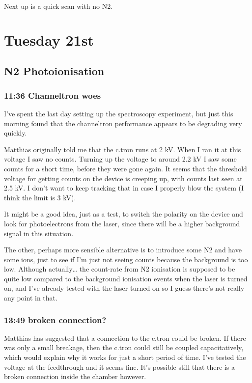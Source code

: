 \documentclass[11pt]{article}
\begin{document}
Next up is a quick scan with no N2.
\section*{Tuesday 21st}
\label{sec-8}
\subsection*{N2 Photoionisation}
\label{sec-8-1}
\subsubsection*{11:36 Channeltron woes}
\label{sec-8-1-1}

I've spent the last day setting up the spectroscopy experiment, but
just this morning found that the channeltron performance appears to be
degrading very quickly.

Matthias originally told me that the c.tron runs at 2 kV. When I ran
it at this voltage I saw no counts. Turning up the voltage to around
2.2 kV I saw some counts for a short time, before they were gone
again. It seems that the threshold voltage for getting counts on the
device is creeping up, with counts last seen at 2.5 kV. I don't want
to keep tracking that in case I properly blow the system (I think the
limit is 3 kV).

It might be a good idea, just as a test, to switch the polarity on the
device and look for photoelectrons from the laser, since there will be
a higher background signal in this situation. 

The other, perhaps more sensible alternative is to introduce some N2
and have some ions, just to see if I'm just not seeing counts because
the background is too low. Although actually\ldots{} the count-rate from N2
ionisation is supposed to be quite low compared to the background
ionisation events when the laser is turned on, and I've already tested
with the laser turned on so I guess there's not really any point in
that. 
\subsubsection*{13:49 broken connection?}
\label{sec-8-1-2}

Matthias has suggested that a connection to the c.tron could be
broken. If there was only a small breakage, then the c.tron could
still be coupled capacitatively, which would explain why it works for
just a short period of time. I've tested the voltage at the
feedthrough and it seems fine. It's possible still that there is a
broken connection inside the chamber however.
\end{document}
